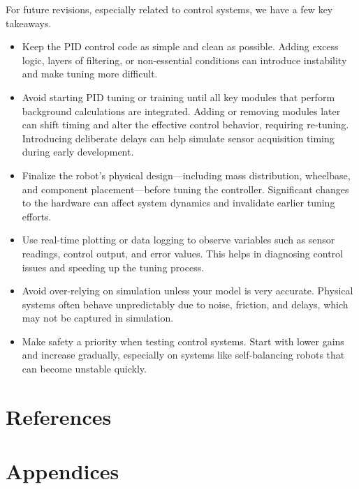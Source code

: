 \documentclass{article}
\begin{document}
\begin{minipage}{\linewidth}
For future revisions, especially related to control systems, we have a few key takeaways.
\begin{itemize}
    \item Keep the PID control code as simple and clean as possible. Adding excess logic, layers of filtering, or non-essential conditions can introduce instability and make tuning more difficult.

    \item Avoid starting PID tuning or training until all key modules that perform background calculations are integrated. Adding or removing modules later can shift timing and alter the effective control behavior, requiring re-tuning. Introducing deliberate delays can help simulate sensor acquisition timing during early development.

    \item Finalize the robot’s physical design—including mass distribution, wheelbase, and component placement—before tuning the controller. Significant changes to the hardware can affect system dynamics and invalidate earlier tuning efforts.

    \item Use real-time plotting or data logging to observe variables such as sensor readings, control output, and error values. This helps in diagnosing control issues and speeding up the tuning process.

    \item Avoid over-relying on simulation unless your model is very accurate. Physical systems often behave unpredictably due to noise, friction, and delays, which may not be captured in simulation.

    \item Make safety a priority when testing control systems. Start with lower gains and increase gradually, especially on systems like self-balancing robots that can become unstable quickly.
\end{itemize}
\end{minipage}

\section{References}
\printbibliography[heading=none]

\section{Appendices}
\end{document}
